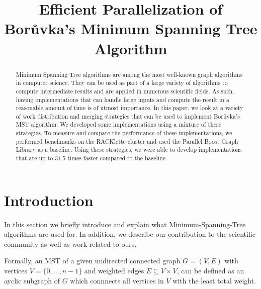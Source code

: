 \documentclass[letterpaper]{article}
\title{Efficient Parallelization of Bor\r{u}vka's \linebreak Minimum Spanning Tree Algorithm}
\begin{document}
\maketitle

\begin{abstract}
Minimum Spanning Tree algorithms are among the most well-known graph algorithms in computer science. They can be used as
part of a large variety of algorithms to compute intermediate results and are applied in numerous scientific fields. As
such, having implementations that can handle large inputs and compute the result in a reasonable amount of time is of
utmost importance. In this paper, we look at a variety of work distribution and merging strategies that can be used to
implement Bor\r{u}vka's MST algorithm. We developed some implementations using a mixture of these strategies. To measure
and compare the performance of these implementations, we performed benchmarks on the RACKlette cluster and used the
Parallel Boost Graph Library as a baseline. Using these strategies, we were able to develop implementations that are up
to $31.5$ times faster compared to the baseline.
\end{abstract}

\section{Introduction}
\label{sec:intro}
In this section we briefly introduce and explain what Minimum-Spanning-Tree algorithms are used for. In addition, we
describe our contribution to the scientific community as well as work related to ours.

Formally, an MST of a given undirected connected graph $G = (V, E)$ with vertices $V = \{ 0, \dotsc, n - 1 \}$ and
weighted edges $E \subseteq V \times V$, can be defined as an ayclic subgraph of $G$ which connnects all vertices in
$V$ with the least total weight.
\end{document}

